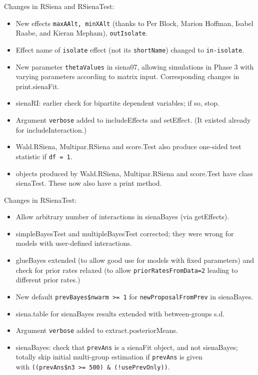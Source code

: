 \documentclass[a4paper,fleqn,11pt]{article}
\newcommand{\+}{\, + \,}
\newcommand{\sfn}[1]{\textsf{#1}}
\begin{document}
\begin{small}
\begin{itemize}
Changes in \textsf{RSiena} and \textsf{RSienaTest}:
\begin{itemize}
   \item New effects \texttt{maxAAlt, minXAlt} (thanks to Per Block, Marion Hoffman,
     Isabel Raabe, and Kieran Mepham), \texttt{outIsolate}.
    \item Effect name of \texttt{isolate} effect (not its \texttt{shortName})
      changed to \texttt{in-isolate}.
   \item New parameter \texttt{thetaValues} in \textsf{siena07},
     allowing simulations in Phase 3
     with varying parameters according to matrix input.
     Corresponding changes in \sfn{print.sienaFit}.
   \item \sfn{sienaRI}: earlier check for bipartite dependent variables; if so, stop.
   \item Argument \texttt{verbose} added to \sfn{includeEffects} and \textsf{setEffect}.
     (It existed already for \sfn{includeInteraction}.)
  \item \sfn{Wald.RSiena}, \sfn{Multipar.RSiena} and \sfn{score.Test} also produce one-sided
     test statistic if \texttt{df = 1}.
   \item objects produced by \sfn{Wald.RSiena},\sfn{ Multipar.RSiena} and \sfn{score.Test}
     have class \sfn{sienaTest}. These now also have a \textsf{print} method.

\end{itemize}

Changes in \textsf{RSienaTest}:
\begin{itemize}
   \item Allow arbitrary number of interactions in \textsf{sienaBayes}
        (via \textsf{getEffects}).
   \item \sfn{simpleBayesTest} and \sfn{multipleBayesTest} corrected; they were wrong
     for models with user-defined interactions.
   \item \sfn{glueBayes} extended (to allow good use for models with fixed parameters)
     and check for prior rates relaxed (to allow \texttt{priorRatesFromData=2}
     leading to different prior rates.)

   \item New default \texttt{prevBayes\$nwarm >= 1} for
        \texttt{newProposalFromPrev} in \textsf{sienaBayes}.
   \item \textsf{siena.table} for \textsf{sienaBayes} results extended with between-groups s.d.
   \item Argument \texttt{verbose} added to \sfn{extract.posteriorMeans}.
   \item \textsf{sienaBayes}: check that \texttt{prevAns} is a \sfn{sienaFit} object,
     and not \textsf{sienaBayes};\\
     totally skip initial multi-group estimation if \texttt{prevAns} is given \\
     with
     \texttt{((prevAns\$n3 >= 500) \& (!usePrevOnly))}.


\end{itemize}
\end{itemize}
\end{small}
\end{document}
